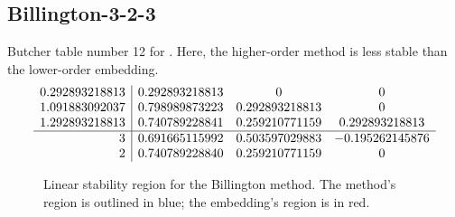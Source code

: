 \documentclass[letterpaper,10pt,english]{sphinxmanual}
\begin{document}
\subsection{Billington-3-2-3}
\label{Butcher:butcher-billington}\label{Butcher:billington-3-2-3}
Butcher table number 12
for {\hyperref[c_interface/User_callable:ARKodeSetIRKTableNum]{}}.  Here, the
higher-order method is less stable than the lower-order embedding.
\begin{gather}
\begin{split}\begin{array}{r|ccc}
  0.292893218813 & 0.292893218813 & 0 & 0 \\
  1.091883092037 & 0.798989873223 & 0.292893218813 & 0 \\
  1.292893218813 & 0.740789228841 & 0.259210771159 & 0.292893218813 \\
  \hline
  3 & 0.691665115992 & 0.503597029883 & -0.195262145876 \\
  2 & 0.740789228840 & 0.259210771159 & 0
\end{array}\end{split}\notag
\end{gather}\begin{figure}[htbp]
\centering
\capstart

\caption{Linear stability region for the Billington method.  The method's
region is outlined in blue; the embedding's region is in red.}\end{figure}
\end{document}
